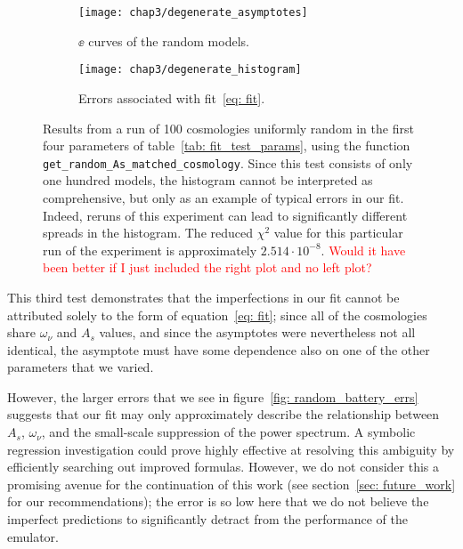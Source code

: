 \begin{figure}[ht!]
    \begin{subfigure}{0.45 \textwidth}
    \centering
 		\texttt{[image: chap3/degenerate\_asymptotes]}
 		\cprotect\caption{$\ee$ curves of the random models.}
 		\label{fig: degenerate_battery}
    \end{subfigure}
    \begin{subfigure}{0.45 \textwidth}
    \centering
 		\texttt{[image: chap3/degenerate\_histogram]}
 		\caption{Errors associated with fit~\ref{eq: fit}.}
 		\label{fig: degenerate_battery_errs}
    \end{subfigure}
        \centering
    \cprotect\caption[$A_s$-degenerate Fit Test]
    		{Results from a run of 100 cosmologies uniformly
    			random in the first four parameters of
    			table~\ref{tab: fit_test_params}, using the function
    			\verb|get_random_As_matched_cosmology|. 
    			Since this test consists of
    			only one hundred models, the histogram cannot be interpreted as
    			comprehensive, but only as an example of typical errors in our
    			fit. Indeed, reruns of this experiment can lead to
    			significantly different spreads in the histogram.
    			The reduced $\chi^2$ value for this particular run of the
    			experiment is approximately $2.514 \cdot 10^{-8}$.
    			\textcolor{red}{Would it have been better if I just included the
    			right plot and no left plot?}}
    \label{fig: degenerate_cosmology_experiment}
\end{figure}

This third test demonstrates that the imperfections in our fit cannot be
attributed solely to the form of equation~\ref{eq: fit};  
since all of the cosmologies share $\omega_\nu$ and $A_s$ values, and since
the asymptotes were nevertheless not all identical, the
asymptote must have some dependence also on one of the other parameters that
we varied.  

However, the larger errors that we see in
figure~\ref{fig: random_battery_errs} suggests that our fit may only
approximately describe the relationship
between $A_s$, $\omega_\nu$, and the small-scale suppression of the power
spectrum. A symbolic regression investigation could prove highly effective at
resolving this ambiguity by efficiently searching out improved formulas. 
However, we do not consider this a promising avenue
for the continuation of this work (see section~\ref{sec: future_work} for our
recommendations); the error
is so low here that we do not believe the imperfect predictions to
significantly detract from the performance of the emulator.

